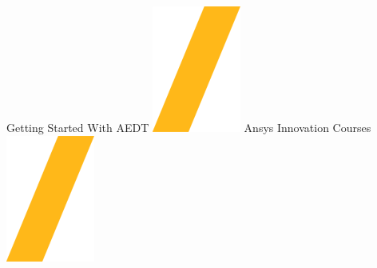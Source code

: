 \documentclass[landscape]{article}
\begin{document}
\begin{center}
Getting Started With AEDT \includegraphics[height=\fontcharht\font`\S]{slash.png} Ansys Innovation Courses \includegraphics[height=\fontcharht\font`\S]{slash.png} %
\end{center}
\end{document}
